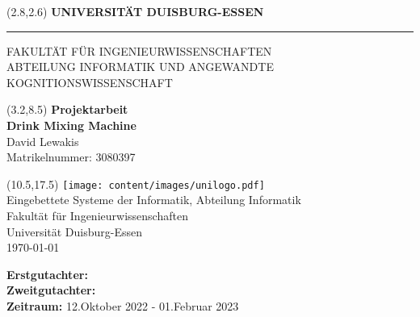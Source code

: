 
\begin{titlepage}
\vspace*{-1cm}
\newlength{\links}
\setlength{\links}{0.9cm}
\setlength{\TPHorizModule}{1cm}
\setlength{\TPVertModule}{1cm}
\textblockorigin{0pt}{0pt}

\sf
\LARGE

\begin{textblock}{16.5}(2.8,2.6)
 \hspace*{-0.25cm} \textbf{UNIVERSITÄT DUISBURG-ESSEN} \\
 \hspace*{-1.15cm} \rule{5mm}{5mm} \hspace*{0.05cm} FAKULTÄT FÜR INGENIEURWISSENSCHAFTEN\\
 \large{}ABTEILUNG INFORMATIK UND ANGEWANDTE KOGNITIONSWISSENSCHAFT\\
\end{textblock}


\begin{textblock}{14.5}(3.2,8.5)
  \large
{ \bf Projektarbeit} \\[1cm]
{\LARGE \Large\bf Drink Mixing Machine} \\[1.3cm]
David Lewakis\\
Matrikelnummer: 3080397\\
\end{textblock}



\begin{textblock}{10}(10.5,17.5)
\texttt{[image: content/images/unilogo.pdf]}\\
\normalsize
\raggedleft
Eingebettete Systeme der Informatik, Abteilung Informatik \\
Fakultät für Ingenieurwissenschaften \\
Universität Duisburg-Essen \\[2ex]

\today\\[15ex]
\raggedright
{\bf Erstgutachter:}  \\
{\bf Zweitgutachter:}\\
{\bf Zeitraum:} 12.Oktober 2022 - 01.Februar 2023\\
\end{textblock}

\end{titlepage}
